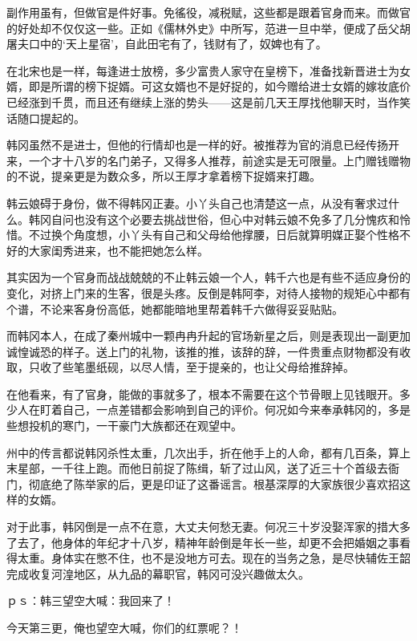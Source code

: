 副作用虽有，但做官是件好事。免徭役，减税赋，这些都是跟着官身而来。而做官的好处却不仅仅这一些。正如《儒林外史》中所写，范进一旦中举，便成了岳父胡屠夫口中的‘天上星宿’，自此田宅有了，钱财有了，奴婢也有了。

在北宋也是一样，每逢进士放榜，多少富贵人家守在皇榜下，准备找新晋进士为女婿，即是所谓的榜下捉婿。可这女婿也不是好捉的，如今赠给进士女婿的嫁妆底价已经涨到千贯，而且还有继续上涨的势头——这是前几天王厚找他聊天时，当作笑话随口提起的。

韩冈虽然不是进士，但他的行情却也是一样的好。被推荐为官的消息已经传扬开来，一个才十八岁的名门弟子，又得多人推荐，前途实是无可限量。上门赠钱赠物的不说，提亲更是为数众多，所以王厚才拿着榜下捉婿来打趣。

韩云娘碍于身份，做不得韩冈正妻。小丫头自己也清楚这一点，从没有奢求过什么。韩冈自问也没有这个必要去挑战世俗，但心中对韩云娘不免多了几分愧疚和怜惜。不过换个角度想，小丫头有自己和父母给他撑腰，日后就算明媒正娶个性格不好的大家闺秀进来，也不能把她怎么样。

其实因为一个官身而战战兢兢的不止韩云娘一个人，韩千六也是有些不适应身份的变化，对挤上门来的生客，很是头疼。反倒是韩阿李，对待人接物的规矩心中都有个谱，不论来客身份高低，她都能暗地里帮着韩千六做得妥妥贴贴。

而韩冈本人，在成了秦州城中一颗冉冉升起的官场新星之后，则是表现出一副更加诚惶诚恐的样子。送上门的礼物，该推的推，该辞的辞，一件贵重点财物都没有收取，只收了些笔墨纸砚，以尽人情，至于提亲的，也让父母给推辞掉。

在他看来，有了官身，能做的事就多了，根本不需要在这个节骨眼上见钱眼开。多少人在盯着自己，一点差错都会影响到自己的评价。何况如今来奉承韩冈的，多是些想投机的寒门，一干豪门大族都还在观望中。

州中的传言都说韩冈杀性太重，几次出手，折在他手上的人命，都有几百条，算上末星部，一千往上跑。而他日前捉了陈缉，斩了过山风，送了近三十个首级去衙门，彻底绝了陈举家的后，更是印证了这番谣言。根基深厚的大家族很少喜欢招这样的女婿。

对于此事，韩冈倒是一点不在意，大丈夫何愁无妻。何况三十岁没娶浑家的措大多了去了，他身体的年纪才十八岁，精神年龄倒是年长一些，却更不会把婚姻之事看得太重。身体实在憋不住，也不是没地方可去。现在的当务之急，是尽快辅佐王韶完成收复河湟地区，从九品的幕职官，韩冈可没兴趣做太久。

ｐｓ：韩三望空大喊：我回来了！

今天第三更，俺也望空大喊，你们的红票呢？！

